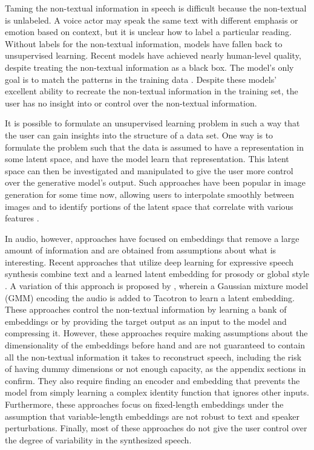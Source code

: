\documentclass{article}
\begin{document}
Taming the non-textual information in speech is difficult because the non-textual is unlabeled. 
A voice actor may speak the same text with different emphasis or emotion based on context, but it is unclear how to label a particular reading.
Without labels for the non-textual information, models have fallen back to unsupervised learning.
Recent models have achieved nearly human-level quality, despite treating the non-textual information as a black box. 
The model's only goal is to match the patterns in the training data \cite{shen2017natural,arik2017deep,arik2017deep2,ping2017deep}. Despite these models' excellent ability to recreate the non-textual information in the training set, the user has no insight into or control over the non-textual information. 

It is possible to formulate an unsupervised learning problem in such a way that the user can gain insights into the structure of a data set.
One way is to formulate the problem such that the data is assumed to have a representation in some latent space, and have the model learn that representation.
This latent space can then be investigated and manipulated to give the user more control over the generative model's output.
Such approaches have been popular in image generation for some time now, allowing users to interpolate smoothly between images and to identify portions of the latent space that correlate with various features \cite{radford2015unsupervised, kingma2018glow}.  

In audio, however, approaches have focused on embeddings that remove a large amount of information and are obtained from assumptions about what is interesting.  Recent approaches that utilize deep learning for expressive speech synthesis combine text and a learned latent embedding for prosody or global style \cite{wang2018style, skerry2018towards}. A variation of this approach is proposed by \cite{hsu2018hierarchical}, wherein a Gaussian mixture model (GMM) encoding the audio is added to Tacotron to learn a latent embedding. These approaches control the non-textual information by learning a bank of embeddings or by providing the target output as an input to the model and compressing it. 
However, these approaches require making assumptions about the dimensionality of the embeddings before hand and are not guaranteed to contain all the non-textual information it takes to reconstruct speech, including the risk of having dummy dimensions or not enough capacity, as the appendix sections in \cite{wang2018style,skerry2018towards, hsu2018hierarchical} confirm. 
They also require finding an encoder and embedding that prevents the model from simply learning a complex identity function that ignores other inputs. Furthermore, these approaches focus on fixed-length embeddings under the assumption that variable-length embeddings are not robust to text and speaker perturbations. Finally, most of these approaches do not give the user control over the degree of variability in the synthesized speech.
\end{document}
